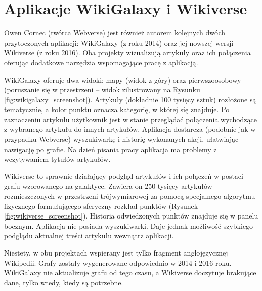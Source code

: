 \section{Aplikacje WikiGalaxy i Wikiverse}

Owen Cornec (twórca Webverse\cite{Webverse}) jest również autorem kolejnych dwóch przytoczonych aplikacji: WikiGalaxy\cite{WikiGalaxy} (z roku 2014) oraz jej nowszej wersji Wikiverse\cite{Wikiverse} (z roku 2016). Oba projekty wizualizują artykuły oraz ich połączenia oferując dodatkowe narzędzia wspomagające pracę z aplikacją.

WikiGalaxy oferuje dwa widoki: mapy (widok z góry) oraz pierwszoosobowy (poruszanie się w przestrzeni – widok zilustrowany na Rysunku \ref{fig:wikigalaxy_screenshot}). Artykuły (dokładnie 100 tysięcy sztuk) rozłożone są tematycznie, a kolor punktu oznacza kategorię, w której się znajduje. Po zaznaczeniu artykułu użytkownik jest w stanie przeglądać połączenia wychodzące z wybranego artykułu do innych artykułów. Aplikacja dostarcza (podobnie jak w przypadku Webverse) wyszukiwarkę i historię wykonanych akcji, ułatwiając nawigację po grafie. Na dzień pisania pracy aplikacja ma problemy z wczytywaniem tytułów artykułów.


Wikiverse to sprawnie działający podgląd artykułów i ich połączeń w postaci grafu wzorowanego na galaktyce. Zawiera on 250 tysięcy artykułów rozmieszczonych w przestrzeni trójwymiarowej za pomocą specjalnego algorytmu fizycznego formułującego sferyczny rozkład punktów (Rysunek \ref{fig:wikiverse_screenshot}). Historia odwiedzonych punktów znajduje się w panelu bocznym. Aplikacja nie posiada wyszukiwarki. Daje jednak możliwość szybkiego podglądu aktualnej treści artykułu wewnątrz aplikacji.


Niestety, w obu projektach wspierany jest tylko fragment anglojęzycznej Wikipedii. Grafy zostały wygenerowane odpowiednio w 2014 i 2016 roku. WikiGalaxy nie aktualizuje grafu od tego czasu, a Wikiverse doczytuje brakujące dane, tylko wtedy, kiedy są potrzebne.